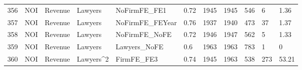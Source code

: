 \begin{table}[ht]
\begin{tabular}{rllllllllll}
  356 & NOI & Revenue & Lawyers & NoFirmFE\_FE1 & 0.72 & 1945 & 1945 & 546 & 6 & 1.36 \\ 
  357 & NOI & Revenue & Lawyers & NoFirmFE\_FEYear & 0.76 & 1937 & 1940 & 473 & 37 & 1.37 \\ 
  358 & NOI & Revenue & Lawyers & NoFirmFE\_NoFE & 0.72 & 1946 & 1947 & 562 & 5 & 1.33 \\ 
  359 & NOI & Revenue & Lawyers & Lawyers\_NoFE & 0.6 & 1963 & 1963 & 783 & 1 & 0 \\ 
  360 & NOI & Revenue & Lawyers^2 & FirmFE\_FE3 & 0.74 & 1945 & 1963 & 538 & 273 & 53.21 \\ 
   \hline
\end{tabular}
\end{table}
